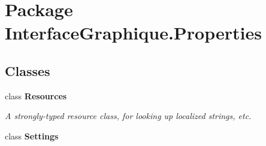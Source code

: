 \hypertarget{namespace_interface_graphique_1_1_properties}{\section{Package Interface\-Graphique.\-Properties}
\label{namespace_interface_graphique_1_1_properties}
}
\subsection*{Classes}
\begin{DoxyCompactItemize}
\item 
class {\bfseries Resources}
\begin{DoxyCompactList}\small\item\em A strongly-\/typed resource class, for looking up localized strings, etc. \end{DoxyCompactList}\item 
class {\bfseries Settings}
\end{DoxyCompactItemize}
